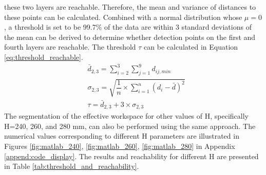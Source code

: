 these two layers are reachable. Therefore, the mean and variance of distances to these points can be calculated. 
Combined with a normal distribution whose $\mu = 0$, a threshold is set to be 99.7\% of the data are within 3 
standard deviations of the mean can be derived to determine whether detection points on the first and fourth 
layers are reachable. The threshold $\tau$ can be calculated in Equation \ref{eq:threshold_reachable}. \\
\vspace{-5mm}
\begin{align}
    &\bar{d}_{2,3} = \sum_{i=2}^3 \sum_{j=1}^9 d_{ij,min} \nonumber \\
    &\sigma_{2,3}=\sqrt{\dfrac{1}{n}\times\sum_{i=1}^n(d_i-\bar{d})^2} \nonumber \\
    &\tau = \bar{d}_{2,3} + 3\times\sigma_{2,3}
    \label{eq:threshold_reachable}
\end{align}
The segmentation of the effective workspace for other values of H, specifically H=240, 260, and 280 mm, 
can also be performed using the same approach. The numerical values corresponding to different H parameters 
are illustrated in Figures \ref{fig:matlab_240}, \ref{fig:matlab_260}, \ref{fig:matlab_280} in Appendix 
\ref{append:code_display}. The results and reachability for different H are presented in Table 
\ref{tab:threshold_and_reachability}.
